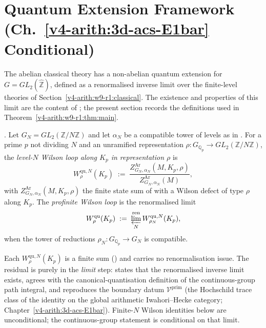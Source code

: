 \section{Quantum Extension Framework (Ch.~\ref{v4-arith:3d-acs-E1bar} Conditional)}
\label{v4-arith:w9-r1:quantum}

The abelian classical theory has a non-abelian quantum extension for
\(G = GL_{2}(\widehat{\mathbb Z})\), defined as a renormalised inverse
limit over the finite-level theories of Section~\ref{v4-arith:w9-r1:classical}.
The existence and properties of this limit are the content of
; the present section records the
definitions used in Theorem~\ref{v4-arith:w9-r1:thm:main}.

\begin{definition}
\label{v4-arith:w9-r1:def:quantum-wilson}
\ClaimStatusDefinitional. Let
\(G_{N}=GL_{2}(\mathbb Z/N\mathbb Z)\) and let \(\alpha_{N}\) be a
compatible tower of levels as in
. For a prime \(p\) not dividing \(N\)
and an unramified representation
\(\rho\colon G_{\mathbb Q_{p}}\to GL_{2}(\mathbb Z/N\mathbb Z)\), the
\emph{level-\(N\) Wilson loop along \(K_{p}\) in representation \(\rho\)} is
\begin{equation}
\label{v4-arith:w9-r1:eq:qu-wilson-N}
W^{\mathrm{qu},N}_{\rho}(K_{p})
\;:=\;\frac{Z^{\mathrm{Ar}}_{G_{N},\alpha_{N}}(M,K_{p},\rho)}{Z^{\mathrm{Ar}}_{G_{N},\alpha_{N}}(M)},
\end{equation}
with \(Z^{\mathrm{Ar}}_{G_{N},\alpha_{N}}(M,K_{p},\rho)\) the finite
state sum of  with a Wilson
defect of type \(\rho\) along \(K_{p}\).
The \emph{profinite Wilson loop} is the
renormalised limit
\begin{equation}
\label{v4-arith:w9-r1:eq:qu-wilson-limit}
W^{\mathrm{qu}}_{\rho}(K_{p})
\;:=\;
\varprojlim_{N}^{\mathrm{ren}} W^{\mathrm{qu},N}_{\rho_{N}}(K_{p}),
\end{equation}
when the tower of reductions
\(\rho_{N}\colon G_{\mathbb Q_{p}}\to G_{N}\) is compatible.
\end{definition}

\begin{remark}
\label{v4-arith:w9-r1:rem:quantum-status}
Each \(W^{\mathrm{qu},N}_{\rho}(K_{p})\) is a finite sum
() and carries no
renormalisation issue. The residual is purely in the \emph{limit}
step:  states that the
renormalised inverse limit exists, agrees with the
canonical-quantisation definition of the continuous-group path
integral, and reproduces the boundary datum \(\mathcal V^{\mathrm{prim}}\)
(the Hochschild trace class of the identity on the global arithmetic
Iwahori--Hecke category; Chapter~\ref{v4-arith:3d-acs-E1bar}). Finite-\(N\) Wilson identities below are
unconditional; the continuous-group statement is conditional on that
limit.
\end{remark}

